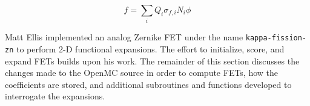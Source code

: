 \documentclass[10pt]{article}
\newcommand{\beq}{\begin{equation}}
\newcommand{\eeq}{\end{equation}}
\numberwithin{equation}{section} %
\begin{document}
\beq
f=\sum_{i}Q_i\sigma_{f,i}N_i\phi
\eeq

Matt Ellis implemented an analog Zernike FET under the name {\tt kappa-fission-zn} to perform 2-D functional expansions. The effort to initialize, score, and expand FETs builds upon his work. The remainder of this section discusses the changes made to the OpenMC source in order to compute FETs, how the coefficients are stored, and additional subroutines and functions developed to interrogate the expansions.

\end{document}

